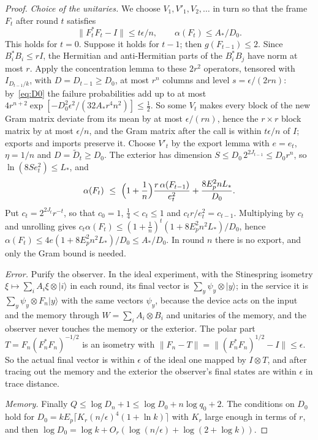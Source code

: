 \begin{proof}
\emph{Choice of the unitaries.} We choose $V_1,V'_1,V_2,\dots$ in turn so that the frame $F_t$ after round $t$ satisfies
\begin{equation}\label{eq:streaming-induction}
\|F_t^*F_t-I\|\le t\epsilon/n,\qquad \alpha(F_t)\le A_*/D_0 .
\end{equation}
This holds for $t=0$. Suppose it holds for $t-1$; then $g(F_{t-1})\le2$. Since $B_i^*B_i\le rI$, the Hermitian and anti-Hermitian parts of the $B_i^*B_j$
have norm at most $r$. Apply the concentration lemma to these $2r^2$ operators, tensored with $I_{D_{t-1}/k}$, with $D=D_{t-1}\ge D_0$, at most $r^n$
columns and level $s=\epsilon/(2rn)$: by~\eqref{eq:D0} the failure probabilities add up to at most
$4r^{n+2}\exp[-D_0^2\epsilon^2/(32A_*r^4n^2)]\le\frac12$. So some $V_t$ makes every block of the new Gram matrix deviate from its mean by at most
$\epsilon/(rn)$, hence the $r\times r$ block matrix by at most $\epsilon/n$, and the Gram matrix after the call is within $t\epsilon/n$ of $I$; exports and
imports preserve it. Choose $V'_t$ by the export lemma with $e=e_t$, $\eta=1/n$ and $D=\widetilde D_t\ge D_0$. The exterior has dimension
$S\le D_0\,2^{2J_{t-1}}\le D_0r^n$, so $\ln(8Se_t^2)\le L_*$, and
\[
\alpha(F_t)\ \le\ \Bigl(1+\frac1n\Bigr)\frac{r\,\alpha(F_{t-1})}{e_t^2}+\frac{8E_p^2nL_*}{D_0}.
\]
Put $c_t=2^{2J_t}r^{-t}$, so that $c_0=1$, $\frac14<c_t\le1$ and $c_tr/e_t^2=c_{t-1}$. Multiplying by $c_t$ and unrolling gives
$c_t\alpha(F_t)\le(1+\frac1n)^t(1+8E_p^2n^2L_*)/D_0$, hence $\alpha(F_t)\le4e(1+8E_p^2n^2L_*)/D_0\le A_*/D_0$. In round $n$ there is no export, and only the
Gram bound is needed.

\emph{Error.} Purify the observer. In the ideal experiment, with the Stinespring isometry $\xi\mapsto\sum_iA_i\xi\otimes|i\rangle$ in each round, its
final vector is $\sum_y\psi_y\otimes|y\rangle$; in the service it is $\sum_y\psi_y\otimes F_n|y\rangle$ with the same vectors $\psi_y$, because the device
acts on the input and the memory through $W=\sum_iA_i\otimes B_i$ and unitaries of the memory, and the observer never touches the memory or the
exterior. The polar part $T=F_n(F_n^*F_n)^{-1/2}$ is an isometry with $\|F_n-T\|=\|(F_n^*F_n)^{1/2}-I\|\le\epsilon$. So the actual final vector is within
$\epsilon$ of the ideal one mapped by $I\otimes T$, and after tracing out the memory and the exterior the observer's final states are within
$\epsilon$ in trace distance.

\emph{Memory.} Finally $Q\le\log D_n+1\le\log D_0+n\log q_0+2$. The conditions on $D_0$ hold for $D_0=kE_p\lceil K_r(n/\epsilon)^4(1+\ln k)\rceil$ with $K_r$
large enough in terms of $r$, and then $\log D_0=\log k+O_r(\log(n/\epsilon)+\log(2+\log k))$.
\end{proof}

